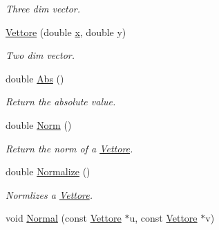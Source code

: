 \begin{DoxyCompactItemize}
\begin{DoxyCompactList}\small\item\em Three dim vector. \end{DoxyCompactList}\item 
\hyperlink{classVettore_ad34a806257f874147444a9dad1d38b9c}{Vettore} (double \hyperlink{classVettore_a711aad4cbe735871dd9e91ab575c878b}{x}, double y)\hypertarget{classVettore_ad34a806257f874147444a9dad1d38b9c}{}\label{classVettore_ad34a806257f874147444a9dad1d38b9c}

\begin{DoxyCompactList}\small\item\em Two dim vector. \end{DoxyCompactList}\item 
double \hyperlink{classVettore_adbeac31b68a3e0dc78dfe0591d392e48}{Abs} ()\hypertarget{classVettore_adbeac31b68a3e0dc78dfe0591d392e48}{}\label{classVettore_adbeac31b68a3e0dc78dfe0591d392e48}

\begin{DoxyCompactList}\small\item\em Return the absolute value. \end{DoxyCompactList}\item 
double \hyperlink{classVettore_ac3486702edb3f0a9835908841db69cfd}{Norm} ()\hypertarget{classVettore_ac3486702edb3f0a9835908841db69cfd}{}\label{classVettore_ac3486702edb3f0a9835908841db69cfd}

\begin{DoxyCompactList}\small\item\em Return the norm of a \hyperlink{classVettore}{Vettore}. \end{DoxyCompactList}\item 
double \hyperlink{classVettore_aef629c102c4d237ef6e4897238f5bc18}{Normalize} ()\hypertarget{classVettore_aef629c102c4d237ef6e4897238f5bc18}{}\label{classVettore_aef629c102c4d237ef6e4897238f5bc18}

\begin{DoxyCompactList}\small\item\em Normlizes a \hyperlink{classVettore}{Vettore}. \end{DoxyCompactList}\item 
void \hyperlink{classVettore_a6c47c5bf64582210d56650fb8f490201}{Normal} (const \hyperlink{classVettore}{Vettore} $\ast$u, const \hyperlink{classVettore}{Vettore} $\ast$v)\hypertarget{classVettore_a6c47c5bf64582210d56650fb8f490201}{}\label{classVettore_a6c47c5bf64582210d56650fb8f490201}


\end{DoxyCompactItemize}
